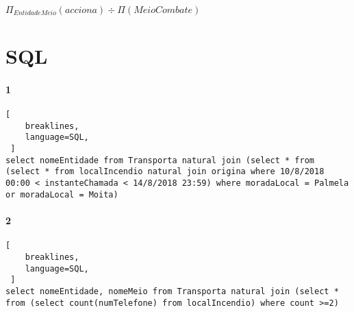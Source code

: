 \documentclass[12pt,a4paper]{article}
\begin{document}
$\Pi_{EntidadeMeio} \left(acciona\right) \div \Pi \left(MeioCombate\right)$

\section{SQL}

\paragraph{1}
\begin{lstlisting}[
    breaklines, 
    language=SQL,
 ]
select nomeEntidade from Transporta natural join (select * from (select * from localIncendio natural join origina where 10/8/2018 00:00 < instanteChamada < 14/8/2018 23:59) where moradaLocal = Palmela or moradaLocal = Moita)
\end{lstlisting}

\paragraph{2}
\begin{lstlisting}[
    breaklines, 
    language=SQL,
 ]
select nomeEntidade, nomeMeio from Transporta natural join (select * from (select count(numTelefone) from localIncendio) where count >=2)
\end{lstlisting}
\end{document}
